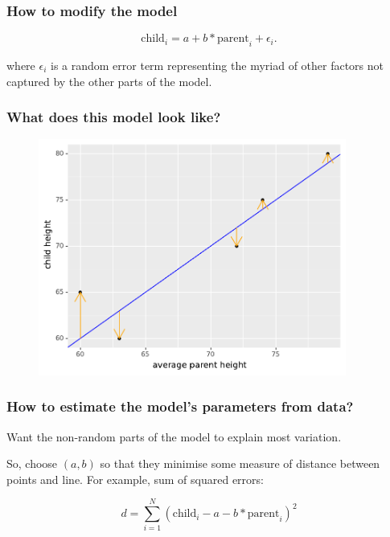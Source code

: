 \documentclass[handout]{beamer}
\begin{document}
\begin{frame}
	\frametitle{How to modify the model}
	
	\begin{equation}
	\text{child}_i = a + b * \text{parent}_i + \epsilon_i.
	\end{equation}
	
	where $\epsilon_i$ is a random error term representing the myriad of other factors not captured by the other parts of the model.
	
\end{frame}

\begin{frame}
	\frametitle{What does this model look like?}
	
	\begin{figure}[ht]
		\centerline{\includegraphics[width=0.9\textwidth]{../figures/galton_model_with_residuals.pdf}}
	\end{figure}
	
\end{frame}

\begin{frame}
	\frametitle{How to estimate the model's parameters from data?}
	
	Want the non-random parts of the model to explain most variation.
	
	\vspace{0.5cm}
	
	So, choose $(a,b)$ so that they minimise some measure of distance between points and line. For example, sum of squared errors:
	
	\begin{equation}
	d = \sum_{i=1}^{N} (\text{child}_i - a - b * \text{parent}_i)^2
	\end{equation}
	
\end{frame}
\end{document}
